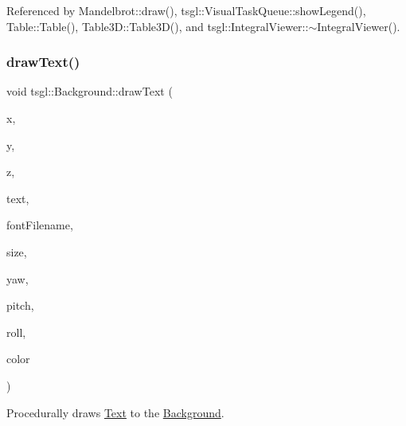 Referenced by Mandelbrot\+::draw(), tsgl\+::\+Visual\+Task\+Queue\+::show\+Legend(), Table\+::\+Table(), Table3\+D\+::\+Table3\+D(), and tsgl\+::\+Integral\+Viewer\+::$\sim$\+Integral\+Viewer().

\mbox{\label{classtsgl_1_1_background_aa83f7bee164e0b07dbe6a6c7d74ec2c8}} 
\subsubsection{\texorpdfstring{draw\+Text()}{drawText()}\hspace{0.1cm}{\footnotesize\ttfamily [2/2]}}
{\footnotesize\ttfamily void tsgl\+::\+Background\+::draw\+Text (\begin{DoxyParamCaption}\item[{float}]{x,  }\item[{float}]{y,  }\item[{float}]{z,  }\item[{std\+::wstring}]{text,  }\item[{std\+::string}]{font\+Filename,  }\item[{float}]{size,  }\item[{float}]{yaw,  }\item[{float}]{pitch,  }\item[{float}]{roll,  }\item[{const \hyperlink{structtsgl_1_1_color_float}{Color\+Float} \&}]{color }\end{DoxyParamCaption})\hspace{0.3cm}{\ttfamily [virtual]}}



Procedurally draws \hyperlink{classtsgl_1_1_text}{Text} to the \hyperlink{classtsgl_1_1_background}{Background}. 

